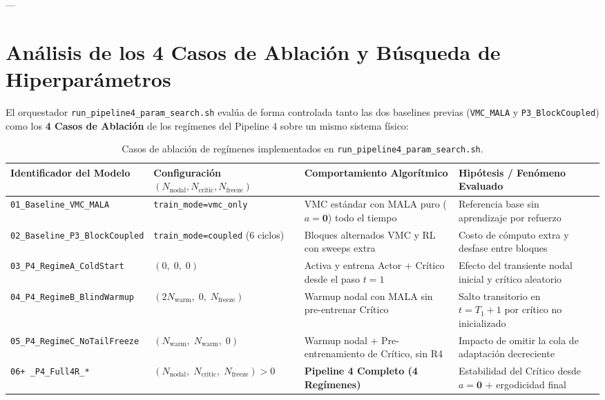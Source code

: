 \documentclass[10pt,a4paper]{article}
\begin{document}
---

\section{An\'alisis de los 4 Casos de Ablaci\'on y B\'usqueda de Hiperpar\'ametros}

El orquestador \texttt{run\_pipeline4\_param\_search.sh} eval\'ua de forma controlada tanto las dos baselines previas (\texttt{VMC\_MALA} y \texttt{P3\_BlockCoupled}) como los \textbf{4 Casos de Ablaci\'on} de los reg\'imenes del Pipeline 4 sobre un mismo sistema f\'isico:

\begin{table}[H]
\centering
\caption{Casos de ablaci\'on de reg\'imenes implementados en \texttt{run\_pipeline4\_param\_search.sh}.}
\label{tab:ablation_cases}
\begin{adjustbox}{max width=\textwidth}
\begin{tabular}{lllll}
\toprule
\textbf{Identificador del Modelo} & \textbf{Configuraci\'on $(N_{\mathrm{nodal}}, N_{\mathrm{critic}}, N_{\mathrm{freeze}})$} & \textbf{Comportamiento Algor\'itmico} & \textbf{Hip\'otesis / Fen\'omeno Evaluado} \\
\midrule
\texttt{01\_Baseline\_VMC\_MALA} & \texttt{train\_mode=vmc\_only} & VMC est\'andar con MALA puro ($a=\bm{0}$) todo el tiempo & Referencia base sin aprendizaje por refuerzo \\
\texttt{02\_Baseline\_P3\_BlockCoupled} & \texttt{train\_mode=coupled} (6 ciclos) & Bloques alternados VMC y RL con sweeps extra & Costo de c\'omputo extra y desfase entre bloques \\
\texttt{03\_P4\_RegimeA\_ColdStart} & $(0,\; 0,\; 0)$ & Activa y entrena Actor + Cr\'itico desde el paso $t=1$ & Efecto del transiente nodal inicial y cr\'itico aleatorio \\
\texttt{04\_P4\_RegimeB\_BlindWarmup} & $(2N_{\mathrm{warm}},\; 0,\; N_{\mathrm{freeze}})$ & Warmup nodal con MALA sin pre-entrenar Cr\'itico & Salto transitorio en $t=T_1+1$ por cr\'itico no inicializado \\
\texttt{05\_P4\_RegimeC\_NoTailFreeze} & $(N_{\mathrm{warm}},\; N_{\mathrm{warm}},\; 0)$ & Warmup nodal + Pre-entrenamiento de Cr\'itico, sin R4 & Impacto de omitir la cola de adaptaci\'on decreciente \\
\texttt{06+ \_P4\_Full4R\_*} & $(N_{\mathrm{nodal}},\; N_{\mathrm{critic}},\; N_{\mathrm{freeze}}) > 0$ & \textbf{Pipeline 4 Completo (4 Reg\'imenes)} & Estabilidad del Cr\'itico desde $a=\bm{0}$ + ergodicidad final \\
\bottomrule
\end{tabular}
\end{adjustbox}
\end{table}
\end{document}
